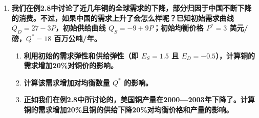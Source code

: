 \begin{enumerate}[label=\textbf{\arabic*.}, leftmargin=*]
			\textbf{答：}
			
			\textbf{a.} 首先推导新的线性需求曲线。设线性需求曲线为：
				$$ Q_d = a - bP $$
			
			根据需求价格点弹性的定义公式 
			$$E_d = \frac{dQ_d}{dP} \cdot \frac{P}{Q}$$
			将已知的均衡点 $(P^*, Q^*) = (3, 18)$ 以及新的需求价格弹性 $E_d = -0.75$ 代入公式计算：
			$$ -0.75 = -b \cdot \frac{3}{18} $$
			解得 $b = 4.5$。
			
			接着，将市场均衡点和求得的斜率系数代入需求曲线方程，得解截距 $a = 31.5 $

			因此，与更小需求弹性相一致的新线性需求曲线方程为：
			$$ Q_d = 31.5 - 4.5P $$
			
			\vspace{1em}
			
			\textbf{b.} 接下来重新计算铜的需求下降 $55\%$ 对铜价的影响。
			
			当铜的市场需求整体下降 $55\%$ 时，意味着在任何既定的价格水平下，新的需求量仅为原需求量的 $45\%$。基于此，我们推导新的需求曲线方程：
				$$ Q_d' = 0.45 \times (31.5 - 4.5P) = 14.175 - 2.025P $$
			
			已知短期内铜的供给曲线保持不变，仍为 $Q_s = -9 + 9P$。在新的市场均衡状态下，供给量等于变动后的需求量（即 $Q_s = Q_d'$）。联立供需方程求解新的均衡价格：
			$$ \begin{aligned}
				-9 + 9P &= 14.175 - 2.025P \\
				P' &\approx 2.10
			\end{aligned} $$
			
			最后分析价格的变动幅度。初始均衡价格为 $P^* = 3$ 美元/磅，在需求大幅下降 $55\%$ 后，市场均衡价格跌至约 $2.10$ 美元/磅。对应的价格下跌幅度为：
			$$ \frac{3 - 2.10}{3} \times 100\% = 30\% $$
			
			由此可见，当长期的需求变得更加缺乏弹性时，需求量的大幅下降最终会导致铜的市场均衡价格出现显著下跌（降幅达 $30\%$）。
			
			\item \textbf{我们在例2.8中讨论了近几年铜的全球需求的下降，部分归因于中国不断下降的消费。不过，如果中国的需求上升了会怎么样呢？已知初始需求曲线 $Q_D = 27 - 3P$，初始供给曲线 $Q_S = -9 + 9P$；初始均衡价格 $P^* = 3$ 美元/磅，$Q^* = 18$ 百万公吨/年。}
			
			\begin{enumerate}[label=\textbf{\alph*.}, leftmargin=2em]
				\item \textbf{利用初始的需求弹性和供给弹性（即 $E_S = 1.5$ 且 $E_D = -0.5$），计算铜的需求增加20\%对铜价的影响。}
				\item \textbf{计算该需求增加对均衡数量 $Q^*$ 的影响。}
				\item \textbf{正如我们在例2.8中所讨论的，美国铜产量在2000—2003年下降了。计算铜的需求增加20\%且铜的供给下降20\%对均衡价格和产量的影响。}
			\end{enumerate}
			

\end{enumerate}
